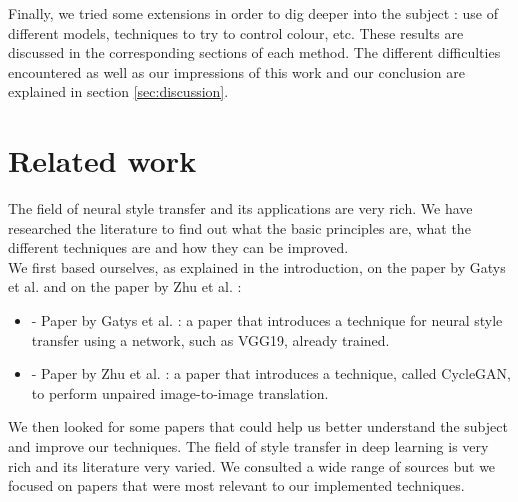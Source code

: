 \documentclass[twocolumn,superscriptaddress,aps, floatfix]{revtex4-1}
\begin{document}
    Finally, we tried some extensions in order to dig deeper into the subject : use of different models, techniques to try to control colour, etc. These results are discussed in the corresponding sections of each method. The different difficulties encountered as well as our impressions of this work and our conclusion are explained in section \ref{sec:discussion}.
    
    
    
    
    \section{Related work}
    
    The field of neural style transfer and its applications are very rich. We have researched the literature to find out what the basic principles are, what the different techniques are and how they can be improved.\\
    
    We first based ourselves, as explained in the introduction, on the paper by Gatys et al. and on the paper by Zhu et al. :
    
    \begin{itemize}
        \item \cite{DBLP:journals/corr/GatysEB15a} - Paper by Gatys et al. : a paper that introduces a technique for neural style transfer using a network, such as VGG19, already trained.
        \item \cite{DBLP:journals/corr/ZhuPIE17} - Paper by Zhu et al. : a paper that introduces a technique, called CycleGAN, to perform unpaired image-to-image translation.
    \end{itemize}
    
    We then looked for some papers that could help us better understand the subject and improve our techniques. The field of style transfer in deep learning is very rich and its literature very varied. We consulted a wide range of sources but we focused on papers that were most relevant to our implemented techniques.
    
\end{document}
